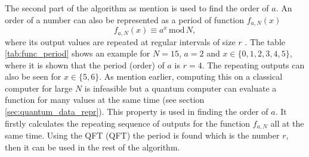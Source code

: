 The second part of the algorithm as mention is used to find the order of $a$. An order of a number can also be represented as a period of function  $f_{a,N}(x)$
\begin{equation}
  f_{a,N}(x)\equiv a^x\,\mathrm{mod}\,N,
\end{equation}
where its output values are repeated at regular intervals of size $r$ \cite{Yanofsky2008}. The table \ref{tab:func_period} shows an example for $N=15$, $a=2$ and $x\in\{0,1,2,3,4,5\}$, where it is shown that the period (order) of $a$ is $r=4$. The repeating outputs can also be seen for $x\in\{5,6\}$. As mention earlier, computing this on a classical computer for large $N$ is infeasible but a quantum computer can evaluate a function for many values at the same time (see section \ref{sec:quantum_data_repr}). This property is used in finding the order of $a$. It firstly calculates the repeating sequence of outputs for the function $f_{a,N}$ all at the same time. Using the QFT (\acl{QFT}) the period is found which is the number $r$, then it can be used in the rest of the algorithm. \cite{McMahon2008}

